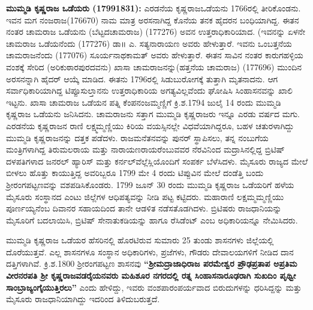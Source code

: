 \newpage

\textbf{ಮುಮ್ಮಡಿ ಕೃಷ್ಣರಾಜ ಒಡೆಯರು (1799\general{\enginline{-}}1831): } ಎರಡನೆಯ ಕೃಷ್ಣರಾಜಒಡೆಯನು 1766ರಲ್ಲಿ ತೀರಿಕೊಂಡನು. ಇವನ ಮಗ ನಂಜರಾಜ(1766\enginline{-}70) ನಾಮ ಮಾತ್ರ ಅರಸನಾಗಿದ್ದ ಕೊನೆಯ ತನಕ ಹೈದರನ ಬಂಧಿಯಾಗಿದ್ದ. ಈತನ ನಂತರ ಚಾಮರಾಜ ಒಡೆಯನು (ಬೆಟ್ಟದಚಾಮರಾಜ) (1772\enginline{-}76) ಅವನ ಉತ್ತರಾಧಿಕಾರಿಯಾದ. (ಇವನನ್ನು ಏಳನೇ ಚಾಮರಾಜ ಒಡೆಯನೆಂದು (1772\enginline{-}76) ಡಾ॥ ಎ. ಸತ್ಯನಾರಾಯಣ ಅವರು ಹೇಳುತ್ತಾರೆ. ಇವನು ಒಂಬತ್ತನೆಯ ಚಾಮರಾಜನೆಂದು (1770\enginline{-}76) ಸೂರ್ಯನಾಥಕಾಮತ್​ ಅವರು ಹೇಳುತ್ತಾರೆ. ಈತನ ಸಾವಿನ ನಂತರ ಕಾರುಗಹಳ್ಳಿಯ ವಂಶಕ್ಕೆ ಸೇರಿದ (ಅರಿಕುಠಾರಪುರದವನು) ಖಾಸಾ ಚಾಮರಾಜನನ್ನು(ಹತ್ತನೆಯ ಚಾಮರಾಜ) (1776\enginline{-}96) ಮುಂದಿನ ಅರಸನನ್ನಾಗಿ ಹೈದರ್​ ಆಯ್ಕೆ ಮಾಡಿದ. ಈತನು 1796ರಲ್ಲಿ ಸಿಡುಬುರೋಗಕ್ಕೆ ತುತ್ತಾಗಿ ಮೃತನಾದನು. ಆಗ ಸರ್ವಾಧಿಕಾರಿಯಾಗಿದ್ದ ಟಿಪ್ಪೂಸುಲ್ತಾನನು ಉತ್ತರಾಧಿಕಾರಿಯ ಅಗತ್ಯವಿಲ್ಲವೆಂದು ಘೋಷಿಸಿ ಸಿಂಹಾಸನವನ್ನು ಖಾಲಿ ಇಟ್ಟನು. ಖಾಸಾ ಚಾಮರಾಜ ಒಡೆಯನ ಪತ್ನಿ ಕೆಂಪನಂಜಮ್ಮಣ್ಣಿಗೆ ಕ್ರಿ.ಶ.1794 ಜುಲೈ 14 ರಂದು ಮುಮ್ಮಡಿ ಕೃಷ್ಣರಾಜ ಒಡೆಯನು ಜನಿಸಿದನು. ಚಾಮರಾಜನು ಸತ್ತಾಗ ಮುಮ್ಮಡಿ ಕೃಷ್ಣರಾಜರು ಇನ್ನೂ ಎರಡು ವರ್ಷದ ಮಗು. ಎರಡನೆಯ ಕೃಷ್ಣರಾಜನ ರಾಣಿ ಲಕ್ಷ್ಮಮ್ಮಣ್ಣಿಯು ಕಿರಿಯ ವಯಸ್ಸಿನಲ್ಲೇ ವಿಧವೆಯಾಗಿದ್ದರೂ, ಬಹಳ ಚತುರಳಾಗಿದ್ದು ಮುಮ್ಮಡಿ ಕೃಷ್ಣರಾಜನನ್ನು ದತ್ತಕ ಪಡೆದಳು. ರಾಜಮನೆತನವನ್ನು ಪುನರ್​ ಸ್ಥಾಪಿಸಲು, ತನ್ನ ನಂಬುಗೆಯ ಮಂತ್ರಿಗಳಾಗಿದ್ದ ತಿರುಮಲರಾಯ ಮತ್ತು ನಾರಾಯಣರಾಯರೆಂಬುವವರ ನೆರವಿನಿಂದ ಮದ್ರಾಸಿನಲ್ಲಿದ್ದ ಬ್ರಿಟಿಷ್​ ದಳಪತಿಗಳಾದ ಜನರಲ್​ ಹ್ಯಾರಿಸ್​ ಮತ್ತು ಕರ್ನಲ್​ ವೆಲ್ಲೆಸ್ಲಿಯೊಂದಿಗೆ ಸಂಪರ್ಕ ಬೆಳೆಸಿದಳು. ಮೈಸೂರು ರಾಜ್ಯದ ಮೇಲೆ ಬೀಳಲು ಹೊತ್ತು ಕಾಯುತ್ತಿದ್ದ ಅವರಿಬ್ಬರೂ 1799 ಮೇ 4 ರಂದು ಟಿಪ್ಪುವಿನ ಮೇಲೆ ದಂಡೆತ್ತಿ ಬಂದು ಶ‍್ರೀರಂಗಪಟ್ಟಣವನ್ನು ವಶಪಡಿಸಿಕೊಂಡರು. 1799 ಜೂನ್​ 30 ರಂದು ಮುಮ್ಮಡಿ ಕೃಷ್ಣರಾಜ ಒಡೆಯರಿಗೆ ಹಳೆಯ ಮೈಸೂರು ಸಂಸ್ಥಾನದ ಎಂಟು ಜಿಲ್ಲೆಗಳ ಆಧಿಪತ್ಯವನ್ನು ನೀಡಿ ಪಟ್ಟ ಕಟ್ಟಿದರು. ಮಹಾರಾಣಿ ಲಕ್ಷಮ್ಮಮ್ಮಣ್ಣಿಯು ಪೂರ್ಣಯ್ಯನೆಂಬ ದಿವಾನರ ಸಹಾಯದಿಂದ ತಾನೇ ಆಡಳಿತ ನಡೆಸತೊಡಗಿದಳು. ಬ್ರಿಟಿಷರು ರಾಜಧಾನಿಯನ್ನು ಮೈಸೂರಿಗೆ ಬದಲಾಯಿಸಿ, ಬ್ರಿಟಿಷ್​ ಸೇನಾತುಕಡಿಯನ್ನು ಹಾಗೂ ರೆಸಿಡೆಂಟ್​ ಎಂಬ ಅಧಿಕಾರಿಯನ್ನೂ ನೇಮಿಸಿದರು.

ಮುಮ್ಮಡಿ ಕೃಷ್ಣರಾಜ ಒಡೆಯರ ಹೆಸರಿನಲ್ಲಿ ಹೊರಟಿರುವ ಸುಮಾರು 25 ತುಂಡು ಶಾಸನಗಳು ಜಿಲ್ಲೆಯಲ್ಲಿ ದೊರೆಯುತ್ತವೆ. ಎಲ್ಲ ಶಾಸನಗಳೂ ಸಂಸ್ಥಾನ ಅಧಿಕಾರಿಗಳು, ಪ್ರಜೆಗಳು, ಗೌಡರು ದೇವಾಲಯಗಳಿಗೆ ನೀಡಿದ ದಾನ ದತ್ತಿಗಳಾಗಿವೆ. ಕ್ರಿ.ಶ.1800 ಶ‍್ರೀರಂಗಪಟ್ಟಣ ಶಾಸನವು\textbf{ “ಶ‍್ರೀಮದ್ರಾಜಾಧಿರಾಜ ಪರಮೇಶ್ವರ ಪ್ರೌಢಪ್ರತಾಪ ಅಪ್ರತಿಮ ವೀರನರಪತಿ ಶ‍್ರೀ ಕೃಷ್ಣರಾಜವಡರೈಯ\-ನವರು ಮಹಿಶೂರ ನಗರದಲ್ಲಿ ರತ್ನ ಸಿಂಹಾಸನಾರೂಢರಾಗಿ ಸುಖದಿಂ ಪೃಥ್ವೀ ಸಾಂಬ್ರಾಜ್ಯಂಗೈಯುತ್ತಿರಲು” }ಎಂದು ಹೇಳಿದ್ದು, ಇವರು ವಂಶಪಾರಂಪರ್ಯವಾದ ಬಿರುದುಗಳನ್ನು ಧರಿಸಿದ್ದನ್ನು ಮತ್ತು ಮೈಸೂರು ರಾಜಧಾನಿಯಾಗಿದ್ದು ಇದರಿಂದ ತಿಳಿದು\-ಬರುತ್ತದೆ.

